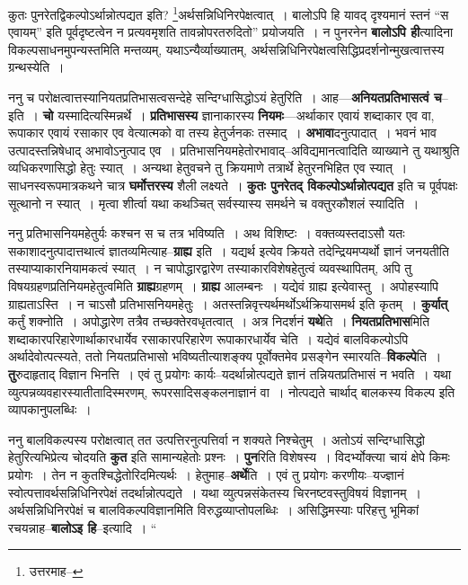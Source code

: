 \documentclass[article,12pt,a4paper]{memoir}
\begin{document}
	कुतः पुनरेतद्विकल्पोऽर्थान्नोत्पद्यत इति? \footnote{उत्तरमाह--\cite{dp-msD-n}}\-अर्थसन्निधिनिरपेक्षत्वात् । बालोऽपि हि यावद् दृश्यमानं स्तनं “स एवायम्” इति पूर्वदृष्टत्वेन न प्रत्यवमृशति तावन्नोपरतरुदितो” प्रयोजयति । न पुनरनेन \textbf{बालोऽपि ही}त्यादिना विकल्पसाधनमुपन्यस्तमिति मन्तव्यम्, यथाऽन्यैर्व्याख्यातम्, अर्थसन्निधिनिरपेक्षत्वसिद्धिप्रदर्शनोन्मुखत्वात्तस्य ग्रन्थस्येति ।
	\pend
      

	  \pstart ननु च परोक्षत्वात्तस्यानियतप्रतिभासत्वसन्देहे सन्दिग्धासिद्धोऽयं हेतुरिति । आह—\textbf{अनियतप्रतिभासत्वं च}--इति । \textbf{चो} यस्मादित्यस्मिन्नर्थे । \textbf{प्रतिभासस्य} ज्ञानाकारस्य \textbf{नियमः}—अर्थाकार एवायं शब्दाकार एव वा, रूपाकार एवायं रसाकार एव वेत्यात्मको वा तस्य हेतुर्जनकः तस्माद् । \textbf{अभावा}दनुत्पादात् । भवनं भाव उत्पादस्तन्निषेधाद् अभावोऽनुत्पाद एव । प्रतिभासनियमहेतोरभावाद्--अविद्यमानत्वादिति व्याख्याने तु यथाश्रुति व्यधिकरणासिद्धो हेतुः स्यात् । अन्यथा हेतुवचने तु क्रियमाणे तत्रार्थे हेतुरनभिहित एव स्यात् । साधनस्वरूपमात्रकथने चात्र \textbf{घर्मोत्तरस्य} शैली लक्ष्यते । \textbf{कुतः पुनरेतद् विकल्पोऽर्थान्नोत्पद्यत} इति च पूर्वपक्षः सूत्थानो न स्यात् । मृत्वा शीर्त्वा यथा कथञ्चित् सर्वस्यास्य समर्थने च वक्तुरकौशलं स्यादिति ।
	\pend
      

	  \pstart ननु प्रतिभासनियमहेतुर्यः कश्चन स च तत्र भविष्यति । अथ विशिष्टः । वक्तव्यस्तदाऽसौ यतः सकाशादनुत्पादात्तथात्वं ज्ञातव्यमित्याह--\textbf{ग्राह्य} इति । यद्यर्थ इत्येव क्रियते तदेन्द्रियमप्यर्थो ज्ञानं जनयतीति तस्याप्याकारनियामकत्वं स्यात् । न चापोद्धारद्वारेण तस्याकारविशेषहेतुत्वं व्यवस्थापितम्, अपि तु विषयग्रहणप्रतिनियमहेतुत्वमिति \textbf{ग्राह्य}ग्रहणम् । \textbf{ग्राह्य} आलम्बनः । यद्येवं ग्राह्य इत्येवास्तु । अपोहस्यापि ग्राह्यताऽस्ति । न चाऽसौ प्रतिभासनियमहेतुः । अतस्तन्निवृत्त्यर्थमर्थोऽर्थक्रियासमर्थ इति कृतम् । \textbf{कुर्यात्} कर्तुं शक्नोति । अपोद्धारेण तत्रैव तच्छक्तेरवधृतत्वात् । अत्र निदर्शनं \textbf{यथे}ति । \textbf{नियतप्रतिभास}मिति शब्दाकारपरिहारेणार्थाकारधार्येव रसाकारपरिहारेण रूपाकारधार्येव चेति । यद्येवं बालविकल्पोऽपि अर्थादेवोत्पत्स्यते, ततो नियतप्रतिभासो भविष्यतीत्याशङ्क्य पूर्वोक्तमेव प्रसङ्गेन स्मारयति--\textbf{विकल्पे}ति । \textbf{तु}रुदाहृताद् विज्ञान भिनत्ति । एवं तु प्रयोगः कार्यः--यदर्थान्नोत्पद्यते ज्ञानं तन्नियतप्रतिभासं न भवति । यथा व्युत्पन्नव्यवहारस्यातीतादिस्मरणम्, रूपरसादिसङ्कलनाज्ञानं वा । नोत्पद्यते चा\leavevmode{}र्थाद् बालकस्य विकल्प इति व्यापकानुपलब्धिः ।
	\pend
      

	  \pstart ननु बालविकल्पस्य परोक्षत्वात् तत उत्पत्तिरनुत्पत्तिर्वा न शक्यते निश्चेतुम् । अतोऽयं सन्दिग्धासिद्धो हेतुरित्यभिप्रेत्य चोदयति \textbf{कुत} इति सामान्यहेतोः प्रश्नः । \textbf{पुन}रिति विशेषस्य । विदर्भ्योक्त्या चायं क्षेपे किमः प्रयोगः । तेन न कुतश्चिद्धेतोरिदमित्यर्थः । हेतुमाह--\textbf{अर्थे}ति । एवं तु प्रयोगः करणीयः--यज्ज्ञानं स्वोत्पत्तावर्थसन्निधिनिरपेक्षं तदर्थान्नोत्पद्यते । यथा व्युत्पन्नसंकेतस्य चिरनष्टवस्तुविषयं विज्ञानम् । अर्थसन्निधिनिरपेक्षं च बालविकल्पविज्ञानमिति विरुद्धव्याप्तोपलब्धिः । असिद्धिमस्याः परिहत्तु भूमिकां रचयन्नाह--\textbf{बालोऽइ हि}--इत्यादि । \leavevmode{} “
	  
\end{document}
